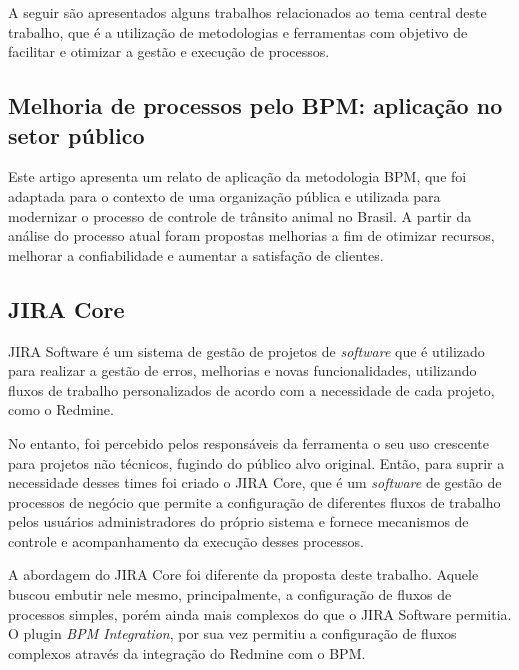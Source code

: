 A seguir são apresentados alguns trabalhos relacionados ao tema central deste trabalho, que é a utilização de metodologias e ferramentas com objetivo de facilitar e otimizar a gestão e execução de processos.

\subsection{Melhoria de processos pelo BPM: aplicação no setor público}\label{subsec:resultado-relacionados-caso_setor_publico}
Este artigo \cite{artigo_relacionado_setor_publico} apresenta um relato de aplicação da metodologia BPM, que foi adaptada para o contexto de uma organização pública e utilizada para modernizar o processo de controle de trânsito animal no Brasil. A partir da análise do processo atual foram propostas melhorias a fim de otimizar recursos, melhorar a confiabilidade e aumentar a satisfação de clientes.

\subsection{JIRA Core}

JIRA Software\cite{jira-software} é um sistema de gestão de projetos de \textit{software} que é utilizado para realizar a gestão de erros, melhorias e novas funcionalidades, utilizando fluxos de trabalho personalizados de acordo com a necessidade de cada projeto, como o Redmine.

No entanto, foi percebido pelos responsáveis da ferramenta o seu uso crescente para projetos não técnicos\cite{jira-core-guide}, fugindo do público alvo original. Então, para suprir a necessidade desses times foi criado o JIRA Core\cite{jira-core}, que é um \textit{software} de gestão de processos de negócio que permite a configuração de diferentes fluxos de trabalho pelos usuários administradores do próprio sistema e fornece mecanismos de controle e acompanhamento da execução desses processos.

A abordagem do JIRA Core foi diferente da proposta deste trabalho. Aquele buscou embutir nele mesmo, principalmente, a configuração de fluxos de processos simples, porém ainda mais complexos do que o JIRA Software permitia. O plugin \textit{BPM Integration}, por sua vez permitiu a configuração de fluxos complexos através da integração do Redmine com o BPM.
